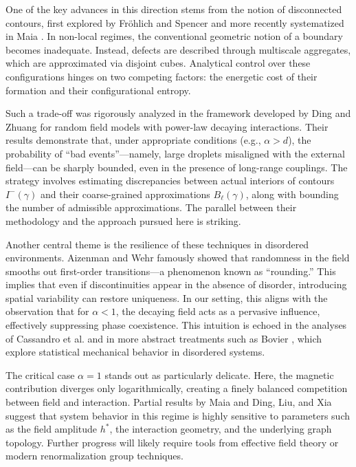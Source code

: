 \documentclass{article}
\begin{document}
\hypertarget{pag9}{}

One of the key advances in this direction stems from the notion of disconnected contours, first explored by Fr\"ohlich and Spencer \cite{fisher1984} and more recently systematized in Maia \cite{maia2024}. In non-local regimes, the conventional geometric notion of a boundary becomes inadequate. Instead, defects are described through multiscale aggregates, which are approximated via disjoint cubes. Analytical control over these configurations hinges on two competing factors: the energetic cost of their formation and their configurational entropy.

Such a trade-off was rigorously analyzed in the framework developed by Ding and Zhuang \cite{ding2024} for random field models with power-law decaying interactions. Their results demonstrate that, under appropriate conditions (e.g., $\alpha>d$), the probability of ``bad events''---namely, large droplets misaligned with the external field---can be sharply bounded, even in the presence of long-range couplings. The strategy involves estimating discrepancies between actual interiors of contours $I^-(\gamma)$ and their coarse-grained approximations $B_\ell(\gamma)$, along with bounding the number of admissible approximations. The parallel between their methodology and the approach pursued here is striking.

Another central theme is the resilience of these techniques in disordered environments. Aizenman and Wehr \cite{aizenman1990} famously showed that randomness in the field smooths out first-order transitions---a phenomenon known as ``rounding.'' This implies that even if discontinuities appear in the absence of disorder, introducing spatial variability can restore uniqueness. In our setting, this aligns with the observation that for $\alpha<1$, the decaying field acts as a pervasive influence, effectively suppressing phase coexistence. This intuition is echoed in the analyses of Cassandro et al. \cite{cassandro2012} and in more abstract treatments such as Bovier \cite{bovier2012}, which explore statistical mechanical behavior in disordered systems.

The critical case $\alpha=1$ stands out as particularly delicate. Here, the magnetic contribution diverges only logarithmically, creating a finely balanced competition between field and interaction. Partial results by Maia \cite{maia2024} and Ding, Liu, and Xia \cite{ding2022} suggest that system behavior in this regime is highly sensitive to parameters such as the field amplitude $h^*$, the interaction geometry, and the underlying graph topology. Further progress will likely require tools from effective field theory or modern renormalization group techniques.
\end{document}
